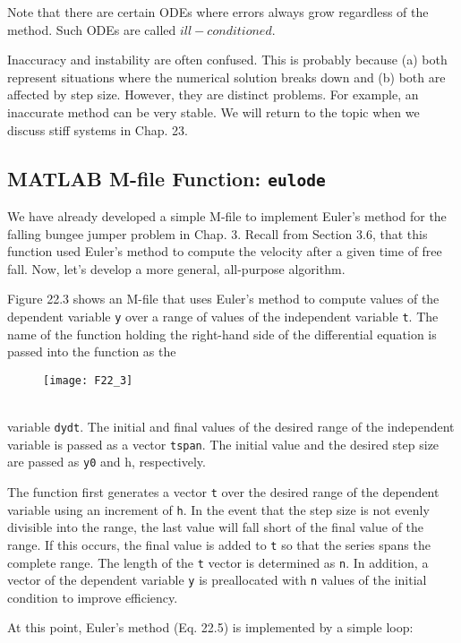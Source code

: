 \documentclass[../main.tex]{subfiles}
\begin{document}
Note that there are certain ODEs where errors always grow regardless of the method.
Such ODEs are called $ill-conditioned$.

Inaccuracy and instability are often confused. This is probably because (a) both represent situations where the numerical solution breaks down and (b) both are affected by step
size. However, they are distinct problems. For example, an inaccurate method can be very
stable. We will return to the topic when we discuss stiff systems in Chap. 23.

\subsection{MATLAB M-file Function: \texttt{eulode}}
We have already developed a simple M-file to implement Euler's method for the falling
bungee jumper problem in Chap. 3. Recall from Section 3.6, that this function used Euler's
method to compute the velocity after a given time of free fall. Now, let's develop a more
general, all-purpose algorithm.

Figure 22.3 shows an M-file that uses Euler's method to compute values of the dependent
variable \texttt{y} over a range of values of the independent variable \texttt{t}. The name of the function
holding the right-hand side of the differential equation is passed into the function as the\\
\begin{figure}[hbt!]
	\texttt{[image: F22\_3]}
	\label{F22.3}
\end{figure}\\
variable \texttt{dydt}. The initial and final values of the desired range of the independent variable
is passed as a vector \texttt{tspan}. The initial value and the desired step size are passed as \texttt{y0} and
h, respectively.

The function first generates a vector \texttt{t} over the desired range of the dependent variable
using an increment of \texttt{h}. In the event that the step size is not evenly divisible into the range,
the last value will fall short of the final value of the range. If this occurs, the final value is
added to \texttt{t} so that the series spans the complete range. The length of the \texttt{t} vector is determined as \texttt{n}. In addition, a vector of the dependent variable \texttt{y} is preallocated with \texttt{n} values
of the initial condition to improve efficiency.

At this point, Euler's method (Eq. 22.5) is implemented by a simple loop:
\end{document}
